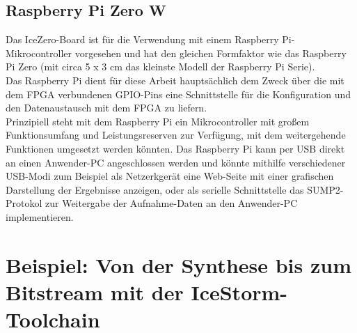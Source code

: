 \subsection{Raspberry Pi Zero W}

Das IceZero-Board ist für die Verwendung mit einem Raspberry Pi-Mikrocontroller vorgesehen und hat den gleichen Formfaktor wie das Raspberry Pi Zero (mit circa 5 x 3 cm das kleinste Modell der Raspberry Pi Serie).\\
Das Raspberry Pi dient für diese Arbeit hauptsächlich dem Zweck über die mit dem FPGA verbundenen GPIO-Pins eine Schnittstelle für die Konfiguration und den Datenaustausch mit dem FPGA zu liefern.\\
Prinzipiell steht mit dem Raspberry Pi ein Mikrocontroller mit großem Funktionsumfang und Leistungsreserven zur Verfügung, mit dem weitergehende Funktionen umgesetzt werden könnten. 
Das Raspberry Pi kann per USB direkt an einen Anwender-PC angeschlossen werden und könnte mithilfe verschiedener USB-Modi zum Beispiel als Netzerkgerät eine Web-Seite mit einer grafischen Darstellung der Ergebnisse anzeigen, oder als serielle Schnittstelle das SUMP2-Protokol zur Weitergabe der Aufnahme-Daten an den Anwender-PC implementieren. 

\clearpage

\section{Beispiel: Von der Synthese bis zum Bitstream mit der IceStorm-Toolchain}
\clearpage


